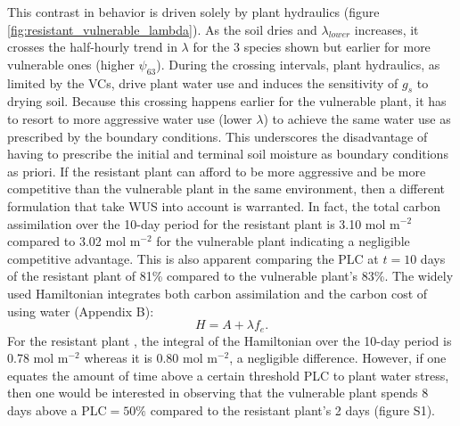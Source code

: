 \documentclass[utf8]{frontiersSCNS} %
\begin{document}
This contrast in behavior is driven solely by plant hydraulics (figure \ref{fig:resistant_vulnerable_lambda}). As the soil dries and $\lambda_{lower}$ increases, it crosses the half-hourly trend in $\lambda$ for the 3 species shown but earlier for more vulnerable ones (higher $\psi_{63}$). During the crossing intervals, plant hydraulics, as limited by the VCs, drive plant water use and induces the sensitivity of $g_s$ to drying soil. Because this crossing happens earlier for the vulnerable plant, it has to resort to more aggressive water use (lower $\lambda$) to achieve the same water use as prescribed by the boundary conditions. This underscores the disadvantage of having to prescribe the initial and terminal soil moisture as boundary conditions as priori. If the resistant plant can afford to be more aggressive and be more competitive than the vulnerable plant in the same environment, then a different formulation that take WUS into account is warranted. In fact, the total carbon assimilation over the 10-day period for the resistant plant is 3.10 mol m$^{-2}$ compared to 3.02 mol m$^{-2}$ for the vulnerable plant indicating a negligible competitive advantage. This is also apparent comparing the PLC at $t=10$ days of the resistant plant of 81\% compared to the vulnerable plant's 83\%. The widely used Hamiltonian integrates both carbon assimilation and the carbon cost of using water (Appendix B):
\begin{equation}
    \label{eqn:Hamiltionian}
    H = A + \lambda f_e.
\end{equation}
For the resistant plant , the integral of the Hamiltonian over the 10-day period is 0.78 mol m$^{-2}$ whereas it is 0.80 mol m$^{-2}$, a negligible difference. However, if one equates the amount of time above a certain threshold PLC to plant water stress, then one would be interested in observing that the vulnerable plant spends 8 days above a PLC$=50\%$ compared to the resistant plant's 2 days (figure S1).
\end{document}
